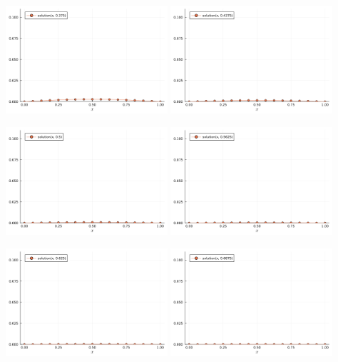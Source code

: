 \documentclass[a4paper]{article}
\begin{document}
\includegraphics[width=0.45\textwidth]{images/result-06}
\includegraphics[width=0.45\textwidth]{images/result-07}

\includegraphics[width=0.45\textwidth]{images/result-08}
\includegraphics[width=0.45\textwidth]{images/result-09}

\includegraphics[width=0.45\textwidth]{images/result-10}
\includegraphics[width=0.45\textwidth]{images/result-11}
\end{document}
